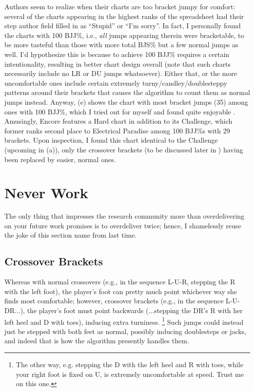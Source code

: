 \documentclass[10pt]{sigplanconf}
\begin{document}
Authors seem to realize when their charts are too bracket jumpy for comfort:
several of the charts appearing in the highest ranks of the spreadsheet had their step author field filled in as ``Stupid'' or ``I'm sorry''.
In fact, I personally found the charts with 100 BJJ\%, i.e., \textit{all} jumps appearing therein were bracketable,
to be more tasteful than those with more total BJS\% but a few normal jumps as well.
I'd hypothesize this is because to achieve 100 BJJ\% requires a certain intentionality,
resulting in better chart design overall
(note that such charts necessarily include no LR or DU jumps whatsoever).
Either that, or the more uncomfortable ones include certain extremely turny/candley/doublesteppy patterns
around their brackets that causes the algorithm to count them as normal jumps instead.
Anyway, (e) shows the chart with most bracket jumps (35) among ones with 100 BJJ\%,
which I tried out for myself and found quite enjoyable \cite{e-paradise}.
Amusingly, Encore \cite{encore}
features a Hard chart in addition to its Challenge,
which former ranks second place to Electrical Paradise among 100 BJJ\%s with 29 brackets.
Upon inspection, I found this chart identical to the Challenge (upcoming in (a)),
only the crossover brackets
(to be discussed later in )
having been replaced by easier, normal ones.

\section{Never Work}

The only thing that impresses the research community more than overdelivering on your future work promises
is to overdeliver twice; hence, I shamelessly reuse the joke of this section name from last time.

\subsection{Crossover Brackets}
\label{sec:xover-brackers}

Whereas with normal crossovers (e.g., in the sequence L-U-R, stepping the R with the left foot),
the player's foot can pretty much point whichever way she finds most comfortable;
however,
crossover brackets (e.g., in the sequence L-U-DR...),
the player's foot must point backwards (...stepping the DR's R with her left heel and D with toes),
inducing extra turniness.%
\footnote{The other way, e.g. stepping the D with the left heel and R with toes, while your right foot is fixed on U, is extremely uncomfortable at speed. Trust me on this one.}
Such jumps could instead just be stepped with both feet as normal,
possibly inducing doublesteps or jacks,
and indeed that is how the algorithm presently handles them.
\end{document}
